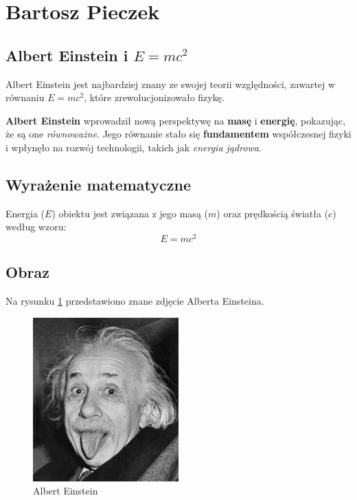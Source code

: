 \section{Bartosz Pieczek}

\subsection{Albert Einstein i $E = mc^2$}

\hspace{\parindent}Albert Einstein jest najbardziej znany ze swojej teorii względności, zawartej w równaniu \( E = mc^2 \), które zrewolucjonizowało fizykę.\par\textbf{Albert Einstein} wprowadził nową perspektywę na \textbf{masę} i \textbf{energię}, pokazując, że są one \textit{równoważne}. Jego równanie stało się \textbf{fundamentem} współczesnej fizyki i wpłynęło na rozwój technologii, takich jak \textit{energia jądrowa}.


\subsection{Wyrażenie matematyczne}
Energia (\( E \)) obiektu jest związana z jego masą (\( m \)) oraz prędkością światła (\( c \)) według wzoru:
\[
E = mc^2
\]

\subsection{Obraz}
Na rysunku \ref{fig:einstein} przedstawiono znane zdjęcie Alberta Einsteina.

\begin{figure}[ht]
    \centering
    \includegraphics[width=0.5\textwidth]{pictures/einstein.jpg}
    \caption{Albert Einstein}
    \label{fig:einstein}
\end{figure}

